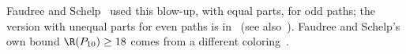 Faudree and Schelp~\cite{FS75} used this
blow-up, with equal parts, for odd paths; the version with unequal parts
for even paths is in~\cite{GRSS07} (see also~\cite{DDR16}). Faudree and
Schelp's own bound $\R(P_{10})\ge18$ comes from a different
coloring~\cite[proof of Theorem~6]{FS75}.
